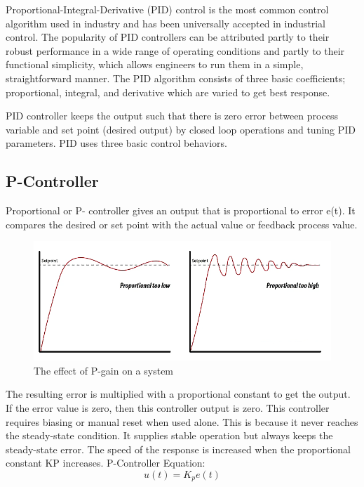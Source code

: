 \documentclass[12pt,a4paper]{book}
\begin{document}
Proportional-Integral-Derivative (PID) control is the most common control algorithm used in industry and has been universally accepted in industrial control. The popularity of PID controllers can be attributed partly to their robust performance in a wide range of operating conditions and partly to their functional simplicity, which allows engineers to run them in a simple, straightforward manner. The PID algorithm consists of three basic coefficients; proportional, integral, and derivative which are varied to get best response. 

PID controller keeps the output such that there is zero error between process variable and set point (desired output) by closed loop operations and tuning PID parameters. PID uses three basic control behaviors. 
\subsection{P-Controller}
Proportional or P- controller gives an output that is proportional to error e(t). It compares the desired or set point with the actual value or feedback process value. 

\begin{figure}[h]
  \centering
  \includegraphics[width=15cm]{image8.png}
  \caption{The effect of P-gain on a system}
  \label{fig:image8}
\end{figure}

The resulting error is multiplied with a proportional constant to get the output. If the error value is zero, then this controller output is zero. This controller requires biasing or manual reset when used alone. This is because it never reaches the steady-state condition. It supplies stable operation but always keeps the steady-state error. The speed of the response is increased when the proportional constant KP increases. P-Controller Equation:
\begin{equation}
  u\left(t\right)=K_pe(t)
  \label{equation:eq1}
\end{equation}
\end{document}
